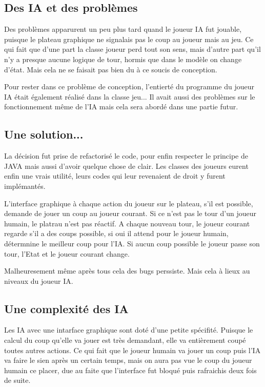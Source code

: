 \documentclass[12pt, legalpaper]{article}
\begin{document}
\subsection{Des IA et des problèmes}
Des problèmes apparurent un peu plus tard quand le joueur IA fut jouable, puisque
le plateau graphique ne signalais pas le coup au joueur mais au jeu. Ce qui fait que
d'une part la classe joueur perd tout son sens, mais d'autre part qu'il n'y a presque
aucune logique de tour, hormis que dans le modèle on change d'état. Mais cela ne se 
faisait pas bien du à ce soucis de conception.

Pour rester dans ce problème de conception, l'entierté du programme du joueur IA
était également réalisé dans la classe jeu...
Il avait aussi des problèmes sur le fonctionnement même de l'IA mais cela sera abordé
dans une partie futur.

\subsection{Une solution...}
La décision fut prise de refactorisé le code, pour enfin respecter le principe de JAVA
mais aussi d'avoir quelque chose de clair. 
Les classes des joueurs eurent enfin une vrais utilité, leurs codes qui leur revenaient
de droit y furent implémantés.

L'interface graphique à chaque action du joueur sur le plateau, s'il est possible,
demande de jouer un coup au joueur courant.
Si ce n'est pas le tour d'un joueur humain, le platrau n'est pas réactif.
A chaque nouveau tour, le joueur courant regarde s'il a des coups possible, si oui il
attend pour le joueur humain, détermnine le meilleur coup pour l'IA. Si aucun coup
possible le joueur passe son tour, l'Etat et le joueur courant change.
\\\par
Malheuresement même après tous cela des bugs perssiste. Mais cela à lieux au niveaux du
joueur IA.

\subsection{Une complexité des IA}
Les IA avec une intarface graphique sont doté d'une petite spécifité. Puisque le calcul
du coup qu'elle va jouer est très demandant, elle va entièrement coupé toutes autres 
actions. Ce qui fait que le joueur humain va jouer un coup puis l'IA va faire le sien
après un certain temps, mais on aura pas vue le coup du joueur humain ce placer, due
au faite que l'interface fut bloqué puis rafraichis deux fois de suite.
\end{document}
